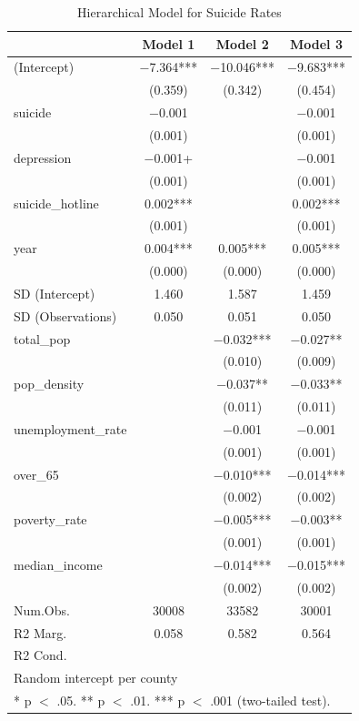 \documentclass[
]{article}
\begin{document}
\begin{table}

\caption{\label{tab:suicide_analysis}Hierarchical Model for Suicide Rates}
\centering
\begin{tabular}[t]{lccc}
\toprule
  & Model 1 & Model 2 & Model 3\\
\midrule
(Intercept) & \num{-7.364}*** & \num{-10.046}*** & \num{-9.683}***\\
 & (\num{0.359}) & (\num{0.342}) & (\num{0.454})\\
suicide & \num{-0.001} &  & \num{-0.001}\\
 & (\num{0.001}) &  & \vphantom{2} (\num{0.001})\\
depression & \num{-0.001}+ &  & \num{-0.001}\\
 & (\num{0.001}) &  & \vphantom{1} (\num{0.001})\\
suicide\_hotline & \num{0.002}*** &  & \num{0.002}***\\
 & (\num{0.001}) &  & (\num{0.001})\\
year & \num{0.004}*** & \num{0.005}*** & \num{0.005}***\\
 & (\num{0.000}) & (\num{0.000}) & (\num{0.000})\\
SD (Intercept) & \num{1.460} & \num{1.587} & \num{1.459}\\
SD (Observations) & \num{0.050} & \num{0.051} & \num{0.050}\\
total\_pop &  & \num{-0.032}*** & \num{-0.027}**\\
 &  & (\num{0.010}) & (\num{0.009})\\
pop\_density &  & \num{-0.037}** & \num{-0.033}**\\
 &  & (\num{0.011}) & (\num{0.011})\\
unemployment\_rate &  & \num{-0.001} & \num{-0.001}\\
 &  & (\num{0.001}) & \vphantom{1} (\num{0.001})\\
over\_65 &  & \num{-0.010}*** & \num{-0.014}***\\
 &  & (\num{0.002}) & \vphantom{1} (\num{0.002})\\
poverty\_rate &  & \num{-0.005}*** & \num{-0.003}**\\
 &  & (\num{0.001}) & (\num{0.001})\\
median\_income &  & \num{-0.014}*** & \num{-0.015}***\\
 &  & (\num{0.002}) & (\num{0.002})\\
\midrule
Num.Obs. & \num{30008} & \num{33582} & \num{30001}\\
R2 Marg. & \num{0.058} & \num{0.582} & \num{0.564}\\
R2 Cond. &  &  & \\
\bottomrule
\multicolumn{4}{l}{\rule{0pt}{1em}Random intercept per county}\\
\multicolumn{4}{l}{\rule{0pt}{1em}* p $<$ .05. ** p $<$ .01. *** p $<$ .001 (two-tailed test).}\\
\end{tabular}
\end{table}
\end{document}
